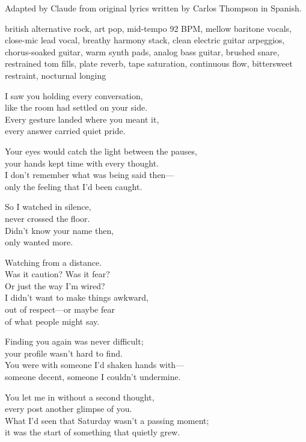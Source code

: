 
\begin{notes}
Adapted by Claude from original lyrics written by Carlos Thompson in Spanish.
\end{notes}
\begin{style}
british alternative rock, art pop, mid-tempo 92 BPM, mellow baritone vocals, close-mic lead vocal, breathy harmony stack, clean electric guitar arpeggios, chorus-soaked guitar, warm synth pads, analog bass guitar, brushed snare, restrained tom fills, plate reverb, tape saturation, continuous flow, bittersweet restraint, nocturnal longing
\end{style}
\begin{lyrics}
I saw you holding every conversation,\\
like the room had settled on your side.\\
Every gesture landed where you meant it,\\
every answer carried quiet pride.

Your eyes would catch the light between the pauses,\\
your hands kept time with every thought.\\
I don't remember what was being said then—\\
only the feeling that I'd been caught.

So I watched in silence,\\
never crossed the floor.\\
Didn't know your name then,\\
only wanted more.

Watching from a distance.\\
Was it caution? Was it fear?\\
Or just the way I'm wired?\\
I didn't want to make things awkward,\\
out of respect—or maybe fear\\
of what people might say.

Finding you again was never difficult;\\
your profile wasn't hard to find.\\
You were with someone I'd shaken hands with—\\
someone decent, someone I couldn't undermine.

You let me in without a second thought,\\
every post another glimpse of you.\\
What I'd seen that Saturday wasn't a passing moment;\\
it was the start of something that quietly grew.


\end{lyrics}

